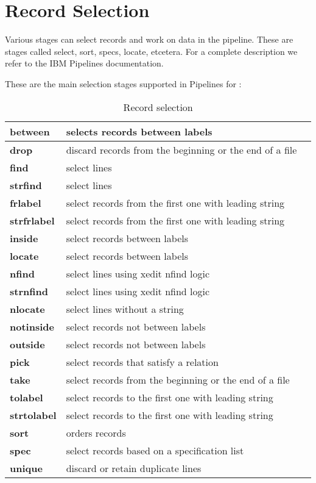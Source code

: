 \section{Record Selection}
Various stages can select records and work on data in the
pipeline. These are stages called select, sort, specs, locate,
etcetera. For a complete description we refer to the IBM Pipelines
documentation. 

These are the main selection stages supported in Pipelines for \nr{}:

\begin{longtable}[l]{|l|p{10cm}|l|}
\caption{ Record selection } \\
\hline
\textbf{between}&selects records between labels \\
\hline
\textbf{drop}&discard records from the beginning or the end of a file \\
\hline
\textbf{find}&select lines \\
\hline
\textbf{strfind}&select lines \\
\hline
\textbf{frlabel}&select records from the first one with leading string \\
\hline
\textbf{strfrlabel}&select records from the first one with leading string \\
\hline
\textbf{inside}&select records between labels \\
\hline
\textbf{locate}&select records between labels \\
\hline
\textbf{nfind}&select lines using xedit nfind logic \\
\hline
\textbf{strnfind}&select lines using xedit nfind logic \\
\hline
\textbf{nlocate}&select lines without a string \\
\hline
\textbf{notinside}&select records not between labels \\
\hline
\textbf{outside}&select records not between labels \\
\hline
\textbf{pick}&select records that satisfy a relation \\
\hline
\textbf{take}&select records from the beginning or the end of a file \\
\hline
\textbf{tolabel}&select records to the first one with leading string \\
\hline
\textbf{strtolabel}&select records to the first one with leading string \\
\hline
\textbf{sort}&orders records \\
\hline
\textbf{spec}&select records based on a specification list \\
\hline
\textbf{unique}&discard or retain duplicate lines \\
\hline
\end{longtable}


